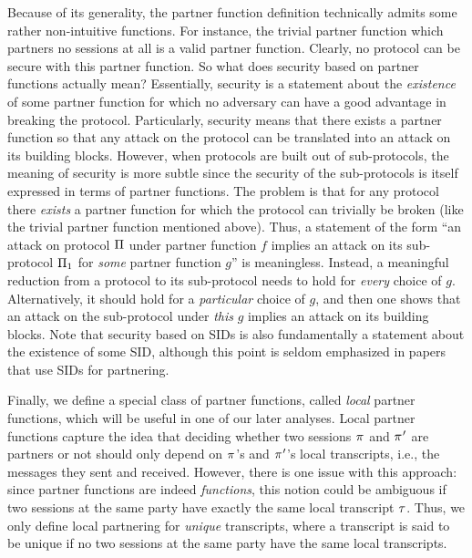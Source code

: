 Because of its generality,
the partner function definition technically admits some rather non-intuitive functions.
For instance,
the trivial partner function which partners no sessions at all is a valid partner function.
Clearly,
no protocol can be secure with this partner function.
So what does security based on partner functions actually mean?
Essentially,
security is a statement about the \emph{existence} of some partner function for which no adversary can have a good advantage in breaking the protocol.
Particularly, 
security means that there exists a partner function so that any attack on the protocol can be translated into an attack on its building blocks.
However,
when protocols are built out of sub-protocols,
the meaning of security is more subtle since the security of the sub-protocols is itself expressed in terms of partner functions.
The problem is that for any protocol there \emph{exists} a partner function for which the protocol can trivially be broken
(like the trivial partner function mentioned above).
Thus,
a statement of the form ``an attack on protocol $\mathrm{\Pi}$ under partner function $f$ implies an attack on its sub-protocol $\mathrm{\Pi}_1$ for \emph{some} partner function $g$'' is meaningless. 
Instead,
a meaningful reduction from a protocol to its sub-protocol needs to hold for \emph{every} choice of $g$.
Alternatively,
it should hold for a \emph{particular} choice of $g$,
and then one shows that an attack on the sub-protocol under \emph{this} $g$ implies an attack on its building blocks.
Note that security based on SIDs is also fundamentally a statement about the existence of some SID,
although this point is seldom emphasized in papers that use SIDs for partnering.



Finally,
we define a special class of partner functions,
called \emph{local} partner functions,
which will be useful in one of our later analyses.
Local partner functions capture the idea that deciding whether two sessions $\oracle$ and $\oracle'$ are partners or not
should only depend on $\oracle$'s and $\oracle'$'s local transcripts,
i.e., the messages they sent and received. 
However,
there is one issue with this approach:
since partner functions are indeed \emph{functions},
this notion could be ambiguous if two sessions at the same party have exactly the same local transcript $\tau$. 
Thus,
we only define local partnering for \emph{unique} transcripts,
where a transcript is said to be unique if no two sessions at the same party have the same local transcripts.


